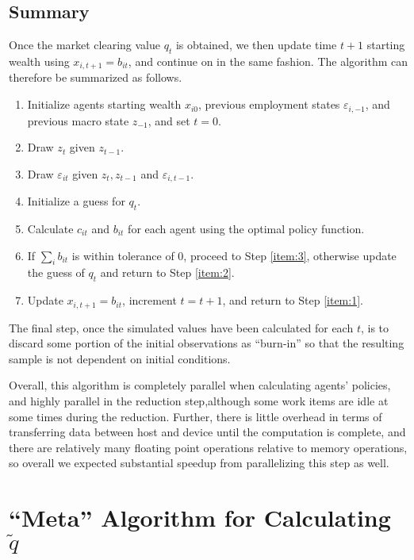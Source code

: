 \documentclass[a4paper,12pt]{article}
\newcommand{\eps}{\varepsilon}
\numberwithin{equation}{section}
\theoremstyle{definition}
\begin{document}
\subsection{Summary}

Once the market clearing value $q_t$ is obtained, we then update time
$t+1$ starting wealth using $x_{i,t+1} = b_{it}$, and continue on in
the same fashion. The algorithm can therefore be summarized as follows.

\begin{enumerate}
\item Initialize agents starting wealth $x_{i0}$, previous employment states $\eps_{i,-1}$, and previous macro state $z_{-1}$, and set $t = 0$.
\item \label{item:1} Draw $z_t$ given $z_{t-1}$.
\item Draw $\eps_{it}$ given $z_t, z_{t-1}$ and $\eps_{i,t-1}$.
\item Initialize a guess for $q_t$.
\item \label{item:2} Calculate $c_{it}$ and $b_{it}$ for each agent using the optimal policy function.
\item If $\sum_i b_{it}$ is within tolerance of 0, proceed to Step \ref{item:3}, otherwise update the guess of $q_t$ and return to Step \ref{item:2}.
\item \label{item:3} Update $x_{i,t+1} = b_{it}$, increment $t = t+1$, and return to Step \ref{item:1}.
\end{enumerate}

The final step, once the simulated values have been
calculated for each $t$, is to discard some portion of the initial
observations as ``burn-in'' so that the resulting sample is not
dependent on initial conditions.

Overall, this algorithm is completely parallel when calculating
agents' policies, and highly parallel in the reduction step,although
some work items are idle at some times during the reduction. Further,
there is little overhead in terms of transferring data between host
and device until the computation is complete, and there are relatively
many floating point operations relative to memory operations, so
overall we expected substantial speedup from parallelizing this step
as well.

\section{``Meta'' Algorithm for Calculating $\tilde{q}$}
\label{sec:meta-algor-calc}
\end{document}
